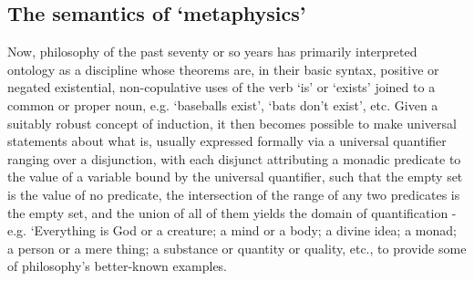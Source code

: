 \documentclass[]{article}
\begin{document}
\subsection{The semantics of `metaphysics'}
Now, philosophy of the past seventy or so years has primarily interpreted ontology 
as a discipline whose theorems are, 
in their basic syntax, 
positive or negated existential, non-copulative uses of the verb `is' or `exists' joined to a common or proper noun, 
e.g. `baseballs exist', `bats don't exist', etc.
Given a suitably robust concept of induction, it then becomes possible to make universal statements about what is, 
usually expressed formally via a universal quantifier ranging over a disjunction, 
with each disjunct
attributing a monadic predicate to the value of a variable bound by the universal
quantifier, 
such that the empty set is the value of no predicate, 
the intersection of the range of any two predicates is the empty set, 
and the union of all of them
yields the domain of quantification - 
e.g. `Everything is God or a creature; a mind or a body; a divine idea; a monad; a person or a mere thing; a substance or quantity or quality, etc., to provide some of philosophy's better-known examples. 
\end{document}
